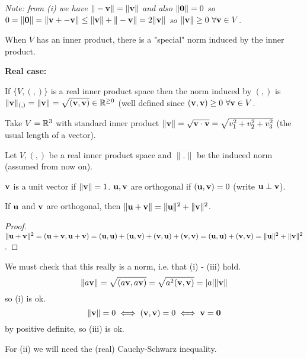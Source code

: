 \documentclass[10pt, a4paper]{article}
\begin{document}
\textit{Note:
from (i) we have $\|-\mathbf{v}\| = \|\mathbf{v}\|$ and also $\|\mathbf{0}\| = 0$ so $0 = \|\mathbf{0}\| = \|\mathbf{v} + -\mathbf{v}\| \leq \|\mathbf{v}\| + \|-\mathbf{v}\| = 2\|\mathbf{v}\|$
so $\|\mathbf{v}\| \geq 0\ \forall \mathbf{v} \in V$.}

When $V$ has an inner product,
there is a "special" norm induced by the inner product.

\textbf{Real case:}
\begin{definition}
    If $\{V, (,)\}$ is a real inner product space then the norm induced by $(,)$ is $\|\mathbf{v}\|_{(,)} = \|\mathbf{v}\| = \sqrt{(\mathbf{v}, \mathbf{v})} \in \mathbb{R} ^ {\geq 0}$
    (well defined since $(\mathbf{v}, \mathbf{v}) \geq 0\ \forall \mathbf{v} \in V$.
\end{definition}

\begin{example}
    Take $V = \mathbb{R} ^ 3$ with standard inner product $\|\mathbf{v}\| = \sqrt{\mathbf{v} \cdot \mathbf{v}} = \sqrt{v_1 ^ 2 + v_2 ^ 2 + v_3 ^ 2}$
    (the usual length of a vector).
\end{example}

Let $V, (,)$ be a real inner product space and $\|.\|$ be the induced norm
(assumed from now on).

\begin{definition}
    $\mathbf{v}$ is a unit vector if $\|\mathbf{v}\| = 1$.
    $\mathbf{u}, \mathbf{v}$ are orthogonal if $(\mathbf{u}, \mathbf{v}) = 0$
    (write $\mathbf{u} \perp \mathbf{v}$).
\end{definition}

\begin{theorem}[Pythagoras]
    If $\mathbf{u}$ and $\mathbf{v}$ are orthogonal,
    then $\|\mathbf{u} + \mathbf{v}\| = \|\mathbf{u}\| ^ 2 + \|\mathbf{v}\| ^ 2$.

    \begin{proof}
        $\|\mathbf{u} + \mathbf{v}\| ^ 2 = (\mathbf{u} + \mathbf{v}, \mathbf{u} + \mathbf{v}) = (\mathbf{u}, \mathbf{u}) + (\mathbf{u, v}) + (\mathbf{v, u}) + (\mathbf{v, v}) = (\mathbf{u, u}) + (\mathbf{v, v}) = \|\mathbf{u}\| ^ 2 + \|\mathbf{v}\| ^ 2$.
    \end{proof}
\end{theorem}

We must check that this really is a norm,
i.e. that (i) - (iii) hold.
\[
\|a\mathbf{v}\| = \sqrt{(a\mathbf{v}, a\mathbf{v})} = \sqrt{a ^ 2(\mathbf{v, v})} = |a|\|\mathbf{v}\|
\]
so (i) is ok.
\[
\|\mathbf{v}\| = 0 \iff (\mathbf{v, v}) = 0 \iff \mathbf{v = 0}
\]
by positive definite,
so (iii) is ok.

For (ii) we will need the
(real)
Cauchy-Schwarz inequality.
\end{document}
